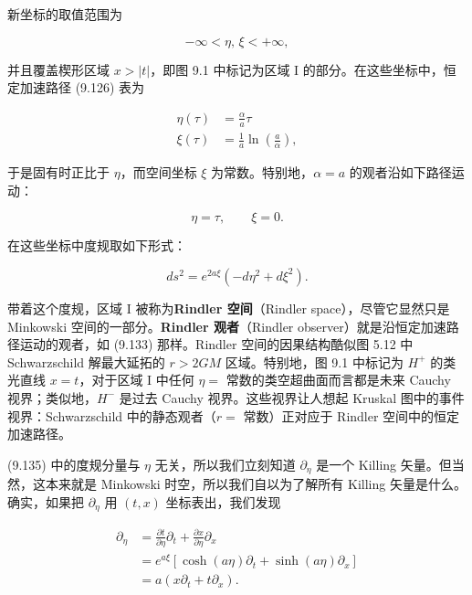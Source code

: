 
新坐标的取值范围为

\begin{equation*}
-\infty < \eta,\, \xi < +\infty,
\tag{9.132}
\end{equation*}

并且覆盖楔形区域 $x>|t|$，即图 9.1 中标记为区域 I 的部分。在这些坐标中，恒定加速路径 (9.126) 表为

\begin{align*}
\eta(\tau) &= \frac{\alpha}{a}\tau \\
\xi(\tau) &= \frac{1}{a}\ln\left(\frac{a}{\alpha}\right),
\tag{9.133}
\end{align*}

于是固有时正比于 $\eta$，而空间坐标 $\xi$ 为常数。特别地，$\alpha=a$ 的观者沿如下路径运动：

\begin{equation*}
\eta = \tau, \qquad \xi = 0.
\tag{9.134}
\end{equation*}

在这些坐标中度规取如下形式：

\begin{equation*}
ds^2 = e^{2a\xi}(-d\eta^2 + d\xi^2).
\tag{9.135}
\end{equation*}

带着这个度规，区域 I 被称为\textbf{Rindler 空间}（Rindler space），尽管它显然只是 Minkowski 空间的一部分。\textbf{Rindler 观者}（Rindler observer）就是沿恒定加速路径运动的观者，如 (9.133) 那样。Rindler 空间的因果结构酷似图 5.12 中 Schwarzschild 解最大延拓的 $r>2GM$ 区域。特别地，图 9.1 中标记为 $H^{+}$ 的类光直线 $x=t$，对于区域 I 中任何 $\eta=$ 常数的类空超曲面而言都是未来 Cauchy 视界；类似地，$H^{-}$ 是过去 Cauchy 视界。这些视界让人想起 Kruskal 图中的事件视界：Schwarzschild 中的静态观者（$r=$ 常数）正对应于 Rindler 空间中的恒定加速路径。

(9.135) 中的度规分量与 $\eta$ 无关，所以我们立刻知道 $\partial_{\eta}$ 是一个 Killing 矢量。但当然，这本来就是 Minkowski 时空，所以我们自以为了解所有 Killing 矢量是什么。确实，如果把 $\partial_{\eta}$ 用 $(t,x)$ 坐标表出，我们发现

\begin{align*}
\partial_{\eta} &= \frac{\partial t}{\partial\eta}\partial_t + \frac{\partial x}{\partial\eta}\partial_x \\
&= e^{a\xi}\left[\cosh(a\eta)\partial_t + \sinh(a\eta)\partial_x\right] \\
&= a(x\partial_t + t\partial_x).
\tag{9.136}
\end{align*}

